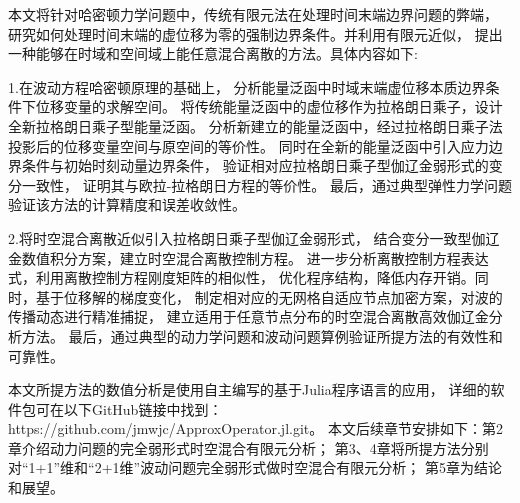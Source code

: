 本文将针对哈密顿力学问题中，传统有限元法在处理时间末端边界问题的弊端，
研究如何处理时间末端的虚位移为零的强制边界条件。并利用有限元近似，
提出一种能够在时域和空间域上能任意混合离散的方法。具体内容如下:

1.在波动方程哈密顿原理的基础上，
分析能量泛函中时域末端虚位移本质边界条件下位移变量的求解空间。
将传统能量泛函中的虚位移作为拉格朗日乘子，设计全新拉格朗日乘子型能量泛函。
分析新建立的能量泛函中，经过拉格朗日乘子法投影后的位移变量空间与原空间的等价性。
同时在全新的能量泛函中引入应力边界条件与初始时刻动量边界条件，
验证相对应拉格朗日乘子型伽辽金弱形式的变分一致性，
证明其与欧拉-拉格朗日方程的等价性。
最后，通过典型弹性力学问题验证该方法的计算精度和误差收敛性。

2.将时空混合离散近似引入拉格朗日乘子型伽辽金弱形式，
结合变分一致型伽辽金数值积分方案，建立时空混合离散控制方程。
进一步分析离散控制方程表达式，利用离散控制方程刚度矩阵的相似性，
优化程序结构，降低内存开销。同时，基于位移解的梯度变化，
制定相对应的无网格自适应节点加密方案，对波的传播动态进行精准捕捉，
建立适用于任意节点分布的时空混合离散高效伽辽金分析方法。
最后，通过典型的动力学问题和波动问题算例验证所提方法的有效性和可靠性。

本文所提方法的数值分析是使用自主编写的基于Julia程序语言的应用，
详细的软件包可在以下GitHub链接中找到：
https://github.com/jmwjc/ApproxOperator.jl.git。
本文后续章节安排如下：第2章介绍动力问题的完全弱形式时空混合有限元分析；
第3、4章将所提方法分别对“1+1”维和“2+1维”波动问题完全弱形式做时空混合有限元分析；
第5章为结论和展望。
